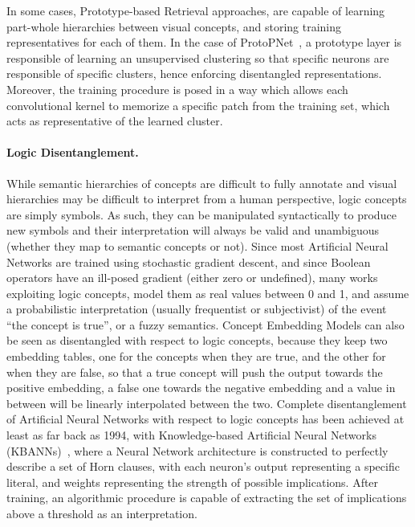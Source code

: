In some cases, Prototype-based Retrieval approaches, are capable of learning part-whole hierarchies between visual concepts, and storing training representatives for each of them. In the case of ProtoPNet~\cite{chen2019looks}, a prototype layer is responsible of learning an unsupervised clustering so that specific neurons are responsible of specific clusters, hence enforcing disentangled representations. Moreover, the training procedure is posed in a way which allows each convolutional kernel to memorize a specific patch from the training set, which acts as representative of the learned cluster.

\paragraph{Logic Disentanglement.} While semantic hierarchies of concepts are difficult to fully annotate and visual hierarchies may be difficult to interpret from a human perspective, logic concepts are simply symbols. As such, they can be manipulated syntactically to produce new symbols and their interpretation will always be valid and unambiguous (whether they map to semantic concepts or not). 
Since most Artificial Neural Networks are trained using stochastic gradient descent, and since Boolean operators have an ill-posed gradient (either zero or undefined), many works exploiting logic concepts, model them as real values between 0 and 1, and assume a probabilistic interpretation (usually frequentist or subjectivist) of the event ``the concept is true'', or a fuzzy semantics. Concept Embedding Models can also be seen as disentangled with respect to logic concepts, because they keep two embedding tables, one for the concepts when they are true, and the other for when they are false, so that a true concept will push the output towards the positive embedding, a false one towards the negative embedding and a value in between will be linearly interpolated between the two.
%
Complete disentanglement of Artificial Neural Networks with respect to logic concepts has been achieved at least as far back as 1994, with Knowledge-based Artificial Neural Networks (KBANNs)~\cite{towell1994knowledge}, where a Neural Network architecture is constructed to perfectly describe a set of Horn clauses, with each neuron's output representing a specific literal, and weights representing the strength of possible implications. After training, an algorithmic procedure is capable of extracting the set of implications above a threshold as an interpretation.

